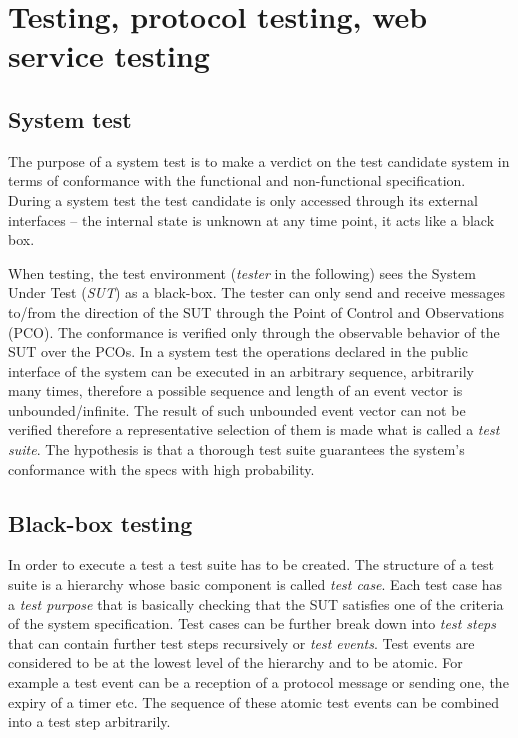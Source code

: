 \documentclass[a4paper]{article}
\begin{document}
\section{Testing, protocol testing, web service testing}

\subsection{System test}

The purpose of a system test is to make a verdict on the test candidate system in terms of conformance with the
functional and non-functional specification. During a system test the test candidate is only accessed through its
external interfaces -- the internal state is unknown at any time point, it acts like a black box.

When testing, the test environment (\emph{tester} in the following) sees the System Under Test (\emph{SUT}) as a
black-box. The tester can only send and receive messages to/from the direction of the SUT through the Point of Control and
Observations (PCO). The conformance is verified only through the observable behavior of the SUT over the PCOs.
In a system test the operations declared in the public interface of the system can be executed in an arbitrary sequence,
arbitrarily many times, therefore a possible sequence and length of an event vector is unbounded/infinite. The
result of such unbounded event vector can not be verified therefore a representative selection of them is made what is
called a \emph{test suite}. The hypothesis is that a thorough test suite guarantees the system's conformance with the
specs with high probability.

\subsection{Black-box testing}

In order to execute a test a test suite has to be created. The structure of a test suite is a hierarchy whose basic
component is called \emph{test case}. Each test case has a \emph{test purpose} that is basically checking that the SUT
satisfies one of the criteria of the system specification. Test cases can be further break down into \emph{test steps}
that can contain further test steps recursively or \emph{test events}. Test events are considered to be at the lowest
level of the hierarchy and to be atomic.
For example a test event can be a reception of a protocol message or sending one, the expiry of a timer etc. The
sequence of these atomic test events can be combined into a test step arbitrarily.
\end{document}
